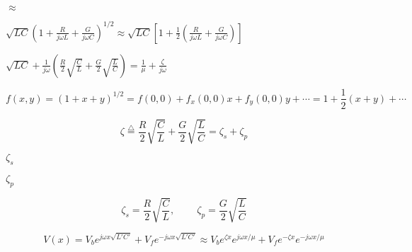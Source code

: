 {\newpage\clearpage
{}%
$\textstyle \approx$%
\lthtmlindisplaymathZ
\lthtmlcheckvsize\clearpage}

{\newpage\clearpage
{}%
$\displaystyle \sqrt{LC}\left(1+\frac{R}{j\omega L}+\frac{G}{j\omega C}\right)^{1/2}
  \approx \sqrt{LC}\left[1+\frac{1}{2}\left(\frac{R}{j\omega L}+\frac{G}{j\omega C}\right)\right]$%
\lthtmlindisplaymathZ
\lthtmlcheckvsize\clearpage}

{\newpage\clearpage
{}%
$\displaystyle \sqrt{LC}+\frac{1}{j\omega}\left( \frac{R}{2}\sqrt{\frac{C}{L}}+\frac{G}{2}\sqrt{\frac{L}{C}} \right)=\frac{1}{\mu}+\frac{\zeta }{j\omega}$%
\lthtmlindisplaymathZ
\lthtmlcheckvsize\clearpage}

{\newpage\clearpage
{}%
\begin{displaymath} f(x,y)=(1+x+y)^{1/2}=f(0,0)+f_x(0,0)x+f_y(0,0)y+\cdots
=1+\frac{1}{2}(x+y)+\cdots \end{displaymath}%
\lthtmldisplayZ
\lthtmlcheckvsize\clearpage}

{\newpage\clearpage
{}%
\begin{displaymath} \zeta\stackrel{\triangle}{=}\frac{R}{2}\sqrt{\frac{C}{L}}+
\frac{G}{2}\sqrt{\frac{L}{C}}=\zeta_s+\zeta_p
\end{displaymath}%
\lthtmldisplayZ
\lthtmlcheckvsize\clearpage}

{\newpage\clearpage
{}%
$\zeta_s$%
\lthtmlinlinemathZ
\lthtmlcheckvsize\clearpage}

{\newpage\clearpage
{}%
$\zeta_p$%
\lthtmlinlinemathZ
\lthtmlcheckvsize\clearpage}

{\newpage\clearpage
{}%
\begin{displaymath} \zeta_s=\frac{R}{2}\sqrt{\frac{C}{L}},\;\;\;\;\;\;\;\;
\zeta_p=\frac{G}{2}\sqrt{\frac{L}{C}} \end{displaymath}%
\lthtmldisplayZ
\lthtmlcheckvsize\clearpage}

{\newpage\clearpage
{}%
\begin{displaymath}	V(x)=V_be^{j\omega x\sqrt{L'C'}}+V_fe^{-j\omega x\sqrt{L'C'}}
\approx V_be^{\zeta x}e^{j\omega x/\mu}+V_fe^{-\zeta x}e^{-j\omega x/\mu}
\end{displaymath}%
\lthtmldisplayZ
\lthtmlcheckvsize\clearpage}

